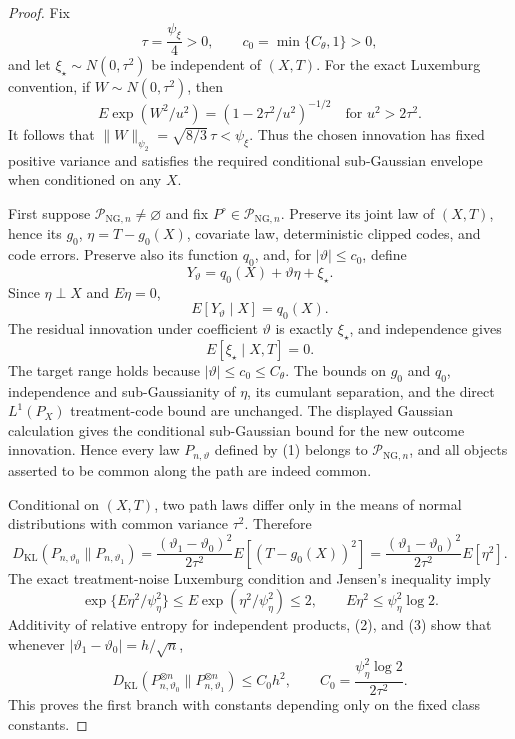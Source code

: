 \documentclass{article}
\begin{document}
\begin{proof}
Fix
\[
 \tau=\frac{\psi_{\xi}}4>0,
 \qquad
 c_0=\min\{C_{\theta},1\}>0,
\]
and let \(\xi_{\star}\sim N(0,\tau^2)\) be independent of \((X,T)\). For the exact Luxemburg convention, if \(W\sim N(0,\tau^2)\), then
\[
 E\exp(W^2/u^2)=(1-2\tau^2/u^2)^{-1/2}
 \quad\text{for }u^2>2\tau^2.
\]
It follows that \(\|W\|_{\psi_2}=\sqrt{8/3}\,\tau<\psi_{\xi}\). Thus the chosen innovation has fixed positive variance and satisfies the required conditional sub-Gaussian envelope when conditioned on any \(X\).

First suppose \(\mathcal P_{\mathrm{NG},n}\neq\varnothing\) and fix \(P^{\circ}\in\mathcal P_{\mathrm{NG},n}\). Preserve its joint law of \((X,T)\), hence its \(g_0\), \(\eta=T-g_0(X)\), covariate law, deterministic clipped codes, and code errors. Preserve also its function \(q_0\), and, for \(|\vartheta|\le c_0\), define
\[
 Y_{\vartheta}=q_0(X)+\vartheta\eta+\xi_{\star}.
 \tag{1}
\]
Since \(\eta\perp X\) and \(E\eta=0\),
\[
 E[Y_{\vartheta}\mid X]=q_0(X).
\]
The residual innovation under coefficient \(\vartheta\) is exactly \(\xi_{\star}\), and independence gives
\[
 E[\xi_{\star}\mid X,T]=0.
\]
The target range holds because \(|\vartheta|\le c_0\le C_{\theta}\). The bounds on \(g_0\) and \(q_0\), independence and sub-Gaussianity of \(\eta\), its cumulant separation, and the direct \(L^1(P_X)\) treatment-code bound are unchanged. The displayed Gaussian calculation gives the conditional sub-Gaussian bound for the new outcome innovation. Hence every law \(P_{n,\vartheta}\) defined by (1) belongs to \(\mathcal P_{\mathrm{NG},n}\), and all objects asserted to be common along the path are indeed common.

Conditional on \((X,T)\), two path laws differ only in the means of normal distributions with common variance \(\tau^2\). Therefore
\[
 D_{\mathrm{KL}}(P_{n,\vartheta_0}\|P_{n,\vartheta_1})
 =\frac{(\vartheta_1-\vartheta_0)^2}{2\tau^2}E[(T-g_0(X))^2]
 =\frac{(\vartheta_1-\vartheta_0)^2}{2\tau^2}E[\eta^2].
 \tag{2}
\]
The exact treatment-noise Luxemburg condition and Jensen's inequality imply
\[
 \exp\{E\eta^2/\psi_{\eta}^2\}
 \le E\exp(\eta^2/\psi_{\eta}^2)\le2,
 \qquad
 E\eta^2\le\psi_{\eta}^2\log2.
 \tag{3}
\]
Additivity of relative entropy for independent products, (2), and (3) show that whenever \(|\vartheta_1-\vartheta_0|=h/\sqrt n\),
\[
 D_{\mathrm{KL}}(P_{n,\vartheta_0}^{\otimes n}\|P_{n,\vartheta_1}^{\otimes n})
 \le C_0h^2,
 \qquad
 C_0=\frac{\psi_{\eta}^2\log2}{2\tau^2}.
 \tag{4}
\]
This proves the first branch with constants depending only on the fixed class constants.


\end{proof}
\end{document}
